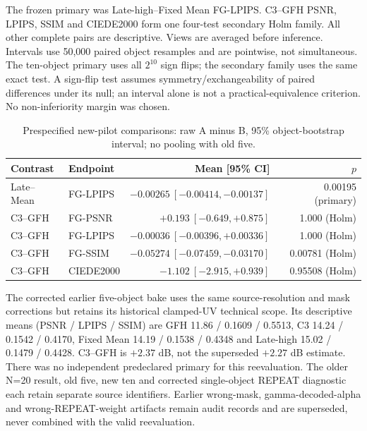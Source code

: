 \documentclass[11pt]{article}
\begin{document}
The frozen primary was Late-high--Fixed Mean FG-LPIPS. C3--GFH PSNR, LPIPS, SSIM and CIEDE2000 form one four-test secondary Holm family. All other complete pairs are descriptive. Views are averaged before inference. Intervals use 50,000 paired object resamples and are pointwise, not simultaneous. The ten-object primary uses all $2^{10}$ sign flips; the secondary family uses the same exact test. A sign-flip test assumes symmetry/exchangeability of paired differences under its null; an interval alone is not a practical-equivalence criterion. No non-inferiority margin was chosen.

\begin{table}[ht]\centering\scriptsize
\caption{Prespecified new-pilot comparisons: raw A minus B, 95\% object-bootstrap interval; no pooling with old five.}\label{tab:bake-paired}
\begin{tabular}{llrr}
\toprule Contrast & Endpoint & Mean [95\% CI] & $p$ \\
\midrule
Late--Mean & FG-LPIPS & $-0.00265\ [-0.00414,-0.00137]$ & 0.00195 (primary) \\
C3--GFH & FG-PSNR & $+0.193\ [-0.649,+0.875]$ & 1.000 (Holm) \\
C3--GFH & FG-LPIPS & $-0.00036\ [-0.00396,+0.00336]$ & 1.000 (Holm) \\
C3--GFH & FG-SSIM & $-0.05274\ [-0.07459,-0.03170]$ & 0.00781 (Holm) \\
C3--GFH & CIEDE2000 & $-1.102\ [-2.915,+0.939]$ & 0.95508 (Holm) \\
\bottomrule\end{tabular}\end{table}

The corrected earlier five-object bake uses the same source-resolution and mask corrections but retains its historical clamped-UV technical scope. Its descriptive means (PSNR / LPIPS / SSIM) are GFH 11.86 / 0.1609 / 0.5513, C3 14.24 / 0.1542 / 0.4170, Fixed Mean 14.19 / 0.1538 / 0.4348 and Late-high 15.02 / 0.1479 / 0.4428. C3--GFH is $+2.37$ dB, not the superseded $+2.27$ dB estimate. There was no independent predeclared primary for this reevaluation. The older N=20 result, old five, new ten and corrected single-object REPEAT diagnostic each retain separate source identifiers. Earlier wrong-mask, gamma-decoded-alpha and wrong-REPEAT-weight artifacts remain audit records and are superseded, never combined with the valid reevaluation.
\end{document}
